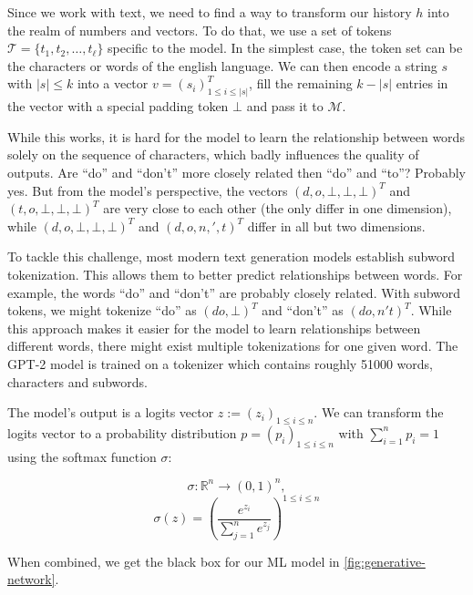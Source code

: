 Since we work with text, we need to find a way to transform our history $h$ into the realm of numbers and vectors.
To do that, we use a set of tokens $\mathcal{T} = \{ t_1, t_2, \dots, t_\ell \}$ specific to the model.
In the simplest case, the token set can be the characters or words of the english language.
We can then encode a string $s$ with $|s| \leq k$ into a vector $v = \left(s_i\right)^T_{1 \leq i \leq |s|}$, fill the remaining $k - |s|$ entries in the vector with a special padding token $\bot$ and pass it to $\mathcal{M}$.
	
While this works, it is hard for the model to learn the relationship between words solely on the sequence of characters, which badly influences the quality of outputs.
Are ``do'' and ``don't'' more closely related then ``do'' and ``to''?
Probably yes.
But from the model's perspective, the vectors $(d, o, \bot, \bot, \bot)^T$ and $(t, o, \bot, \bot, \bot)^T$ are very close to each other (the only differ in one dimension), while $(d, o, \bot, \bot, \bot)^T$ and $(d, o, n, ', t)^T$ differ in all but two dimensions.

To tackle this challenge, most modern text generation models establish subword tokenization.
This allows them to better predict relationships between words.
For example, the words ``do'' and ``don't'' are probably closely related.
With subword tokens, we might tokenize ``do'' as $(do, \bot)^T$ and ``don't'' as $(do, n't)^T$.
While this approach makes it easier for the model to learn relationships between different words, there might exist multiple tokenizations for one given word.
The GPT-2 model is trained on a tokenizer which contains roughly 51000 words, characters and subwords.

The model's output is a logits vector $z := (z_i)_{1 \leq i \leq n}$.
We can transform the logits vector to a probability distribution $p = (p_i)_{1 \leq i \leq n}$ with $\sum_{i=1}^n p_i = 1$ using the softmax function $\sigma$:

$$\sigma \colon \mathbb{R}^n \rightarrow (0,1)^n,$$
$$\sigma(z) = \left(\frac{e^{z_i}}{\sum_{j=1}^n e^{z_j}}\right)^{1 \leq i \leq n}$$

When combined, we get the black box for our ML model in \autoref{fig:generative-network}.


